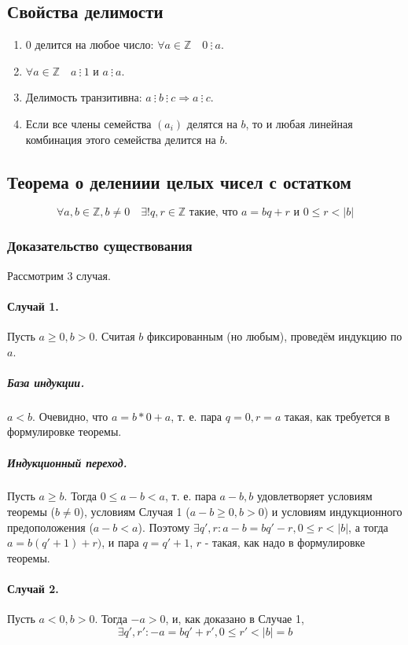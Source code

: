 \documentclass{article}
\newcommand{\divs}{~\vdots~}
\begin{document}
\subsection{Свойства делимости}
\begin{enumerate}
\item $0$ делится на любое число: $\forall a \in \mathbb Z \quad 0 \divs a$.
\item $\forall a \in \mathbb Z \quad a \divs 1$ и $a \divs a$.
\item Делимость транзитивна: $a \divs b \divs c \Rightarrow a \divs c$.
\item Если все члены семейства $(a_i)$ делятся на $b$, то и любая линейная комбинация этого семейства делится на $b$.
\end{enumerate}

\subsection{Теорема о делениии целых чисел с остатком}
\[\forall a, b \in \mathbb Z, b \neq 0 \quad \exists! q, r \in \mathbb Z \text{ такие, что } a = bq + r \text{ и } 0 \leq r < |b|\]


\subsubsection{Доказательство существования}
Рассмотрим 3 случая.
\paragraph{Случай 1.}
Пусть $a \geq 0, b > 0$. Считая $b$ фиксированным (но любым), проведём индукцию по $a$.

\subparagraph{База индукции.}
$a < b$. Очевидно, что $a = b * 0 + a$, т. е. пара $q = 0, r = a$ такая, как требуется в формулировке теоремы.

\subparagraph{Индукционный переход.}
Пусть $a \geq b$. Тогда $0 \leq a-b < a$, т. е. пара $a-b, b$ удовлетворяет условиям теоремы ($b \neq 0$), условиям Случая 1 ($a-b \geq 0, b > 0$) и условиям индукционного предоположения ($a-b < a$). Поэтому $\exists q', r: a - b = bq' - r, 0 \leq r < |b|$, а тогда $a = b(q' + 1) + r)$, и пара $q = q' + 1$, $r$ - такая, как надо в формулировке теоремы.

\paragraph{Случай 2.}
Пусть $a < 0, b > 0$. Тогда $-a > 0$, и, как доказано в Случае 1, \[\exists q', r': -a = bq' + r', 0 \leq r' < |b| = b\]
\end{document}
